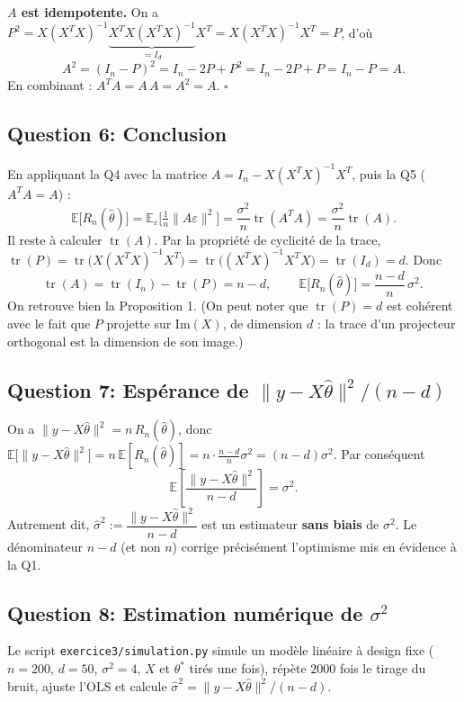 \documentclass[11pt,a4paper]{article}
\newcommand{\E}{\mathbb{E}}
\DeclareMathOperator{\Tr}{tr}
\theoremstyle{plain}
\begin{document}
\textbf{$A$ est idempotente.} On a $P^2=X(X^TX)^{-1}\underbrace{X^TX(X^TX)^{-1}}_{=I_d}X^T=X(X^TX)^{-1}X^T=P$, d'où
\[
    A^2=(I_n-P)^2=I_n-2P+P^2=I_n-2P+P=I_n-P=A .
\]
En combinant : $A^TA=A\,A=A^2=A$. \hfill$\square$

\subsection*{Question 6: Conclusion}

En appliquant la Q4 avec la matrice $A=I_n-X(X^TX)^{-1}X^T$, puis la Q5
($A^TA=A$) :
\[
    \E\big[R_n(\hat\theta)\big]
      =\E_\varepsilon\Big[\tfrac1n\lVert A\varepsilon\rVert^2\Big]
      =\frac{\sigma^2}{n}\Tr(A^TA)
      =\frac{\sigma^2}{n}\Tr(A).
\]
Il reste à calculer $\Tr(A)$. Par la propriété de cyclicité de la trace,
$\Tr(P)=\Tr\big(X(X^TX)^{-1}X^T\big)=\Tr\big((X^TX)^{-1}X^TX\big)=\Tr(I_d)=d$. Donc
\[
    \Tr(A)=\Tr(I_n)-\Tr(P)=n-d,
    \qquad
    \boxed{\,\E\big[R_n(\hat\theta)\big]=\frac{n-d}{n}\,\sigma^2.\,}
\]
On retrouve bien la Proposition 1. (On peut noter que $\Tr(P)=d$ est cohérent
avec le fait que $P$ projette sur $\mathrm{Im}(X)$, de dimension $d$ : la trace
d'un projecteur orthogonal est la dimension de son image.)

\subsection*{Question 7: Espérance de $\lVert y-X\hat\theta\rVert^2/(n-d)$}

On a $\lVert y-X\hat\theta\rVert^2=n\,R_n(\hat\theta)$, donc
$\E\big[\lVert y-X\hat\theta\rVert^2\big]=n\,\E[R_n(\hat\theta)]=n\cdot\frac{n-d}{n}\sigma^2=(n-d)\sigma^2$.
Par conséquent
\[
    \E\!\left[\frac{\lVert y-X\hat\theta\rVert^2}{n-d}\right]=\sigma^2 .
\]
Autrement dit, $\hat\sigma^2:=\dfrac{\lVert y-X\hat\theta\rVert^2}{n-d}$ est un
estimateur \textbf{sans biais} de $\sigma^2$. Le dénominateur $n-d$ (et non $n$)
corrige précisément l'optimisme mis en évidence à la Q1.

\subsection*{Question 8: Estimation numérique de $\sigma^2$}

Le script \texttt{exercice3/simulation.py} simule un modèle linéaire à design
fixe ($n=200$, $d=50$, $\sigma^2=4$, $X$ et $\theta^{*}$ tirés une fois), répète
$2000$ fois le tirage du bruit, ajuste l'OLS et calcule
$\hat\sigma^2=\lVert y-X\hat\theta\rVert^2/(n-d)$.
\end{document}
